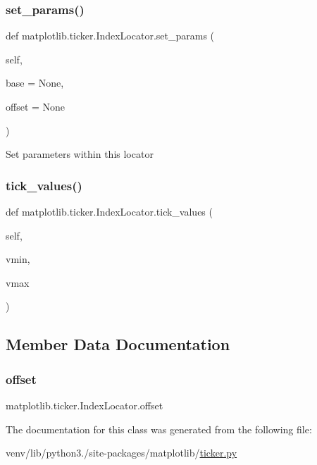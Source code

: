 \subsubsection{\texorpdfstring{set\+\_\+params()}{set\_params()}}
{\footnotesize\ttfamily def matplotlib.\+ticker.\+Index\+Locator.\+set\+\_\+params (\begin{DoxyParamCaption}\item[{}]{self,  }\item[{}]{base = {\ttfamily None},  }\item[{}]{offset = {\ttfamily None} }\end{DoxyParamCaption})}

\begin{DoxyVerb}Set parameters within this locator\end{DoxyVerb}
 \mbox{\label{classmatplotlib_1_1ticker_1_1IndexLocator_a39cde517054241f1433d2b38d78d7d85}} 
\subsubsection{\texorpdfstring{tick\+\_\+values()}{tick\_values()}}
{\footnotesize\ttfamily def matplotlib.\+ticker.\+Index\+Locator.\+tick\+\_\+values (\begin{DoxyParamCaption}\item[{}]{self,  }\item[{}]{vmin,  }\item[{}]{vmax }\end{DoxyParamCaption})}



\subsection{Member Data Documentation}
\mbox{\label{classmatplotlib_1_1ticker_1_1IndexLocator_ace3a3d02d80c6280b77a7c6a97ccfdb2}} 
\subsubsection{\texorpdfstring{offset}{offset}}
{\footnotesize\ttfamily matplotlib.\+ticker.\+Index\+Locator.\+offset}



The documentation for this class was generated from the following file\+:\begin{DoxyCompactItemize}
\item 
venv/lib/python3./site-\/packages/matplotlib/\hyperlink{ticker_8py}{ticker.\+py}\end{DoxyCompactItemize}
